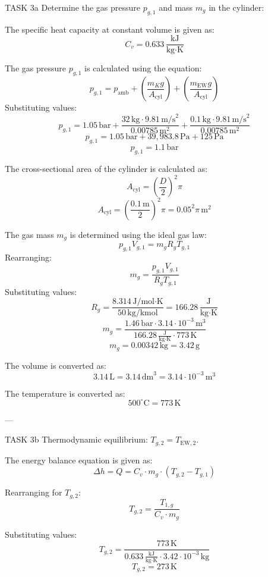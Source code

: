 TASK 3a  
Determine the gas pressure \( p_{g,1} \) and mass \( m_g \) in the cylinder:  

The specific heat capacity at constant volume is given as:  
\[
C_v = 0.633 \, \frac{\text{kJ}}{\text{kg·K}}
\]  

The gas pressure \( p_{g,1} \) is calculated using the equation:  
\[
p_{g,1} = p_{\text{amb}} + \left( \frac{m_K g}{A_{\text{cyl}}} \right) + \left( \frac{m_{\text{EW}} g}{A_{\text{cyl}}} \right)
\]  
Substituting values:  
\[
p_{g,1} = 1.05 \, \text{bar} + \frac{32 \, \text{kg} \cdot 9.81 \, \text{m/s}^2}{0.00785 \, \text{m}^2} + \frac{0.1 \, \text{kg} \cdot 9.81 \, \text{m/s}^2}{0.00785 \, \text{m}^2}
\]  
\[
p_{g,1} = 1.05 \, \text{bar} + 39,983.8 \, \text{Pa} + 125 \, \text{Pa}
\]  
\[
p_{g,1} = 1.1 \, \text{bar}
\]  

The cross-sectional area of the cylinder is calculated as:  
\[
A_{\text{cyl}} = \left( \frac{D}{2} \right)^2 \pi
\]  
\[
A_{\text{cyl}} = \left( \frac{0.1 \, \text{m}}{2} \right)^2 \pi = 0.05^2 \pi \, \text{m}^2
\]  

The gas mass \( m_g \) is determined using the ideal gas law:  
\[
p_{g,1} V_{g,1} = m_g R_g T_{g,1}
\]  
Rearranging:  
\[
m_g = \frac{p_{g,1} V_{g,1}}{R_g T_{g,1}}
\]  
Substituting values:  
\[
R_g = \frac{8.314 \, \text{J/mol·K}}{50 \, \text{kg/kmol}} = 166.28 \, \frac{\text{J}}{\text{kg·K}}
\]  
\[
m_g = \frac{1.46 \, \text{bar} \cdot 3.14 \cdot 10^{-3} \, \text{m}^3}{166.28 \, \frac{\text{J}}{\text{kg·K}} \cdot 773 \, \text{K}}
\]  
\[
m_g = 0.00342 \, \text{kg} = 3.42 \, \text{g}
\]  

The volume is converted as:  
\[
3.14 \, \text{L} = 3.14 \, \text{dm}^3 = 3.14 \cdot 10^{-3} \, \text{m}^3
\]  

The temperature is converted as:  
\[
500^\circ\text{C} = 773 \, \text{K}
\]  

---

TASK 3b  
Thermodynamic equilibrium: \( T_{g,2} = T_{\text{EW},2} \).  

The energy balance equation is given as:  
\[
\Delta h = Q = C_v \cdot m_g \cdot (T_{g,2} - T_{g,1})
\]  

Rearranging for \( T_{g,2} \):  
\[
T_{g,2} = \frac{T_{1,g}}{C_v \cdot m_g}
\]  

Substituting values:  
\[
T_{g,2} = \frac{773 \, \text{K}}{0.633 \, \frac{\text{kJ}}{\text{kg·K}} \cdot 3.42 \cdot 10^{-3} \, \text{kg}}
\]  
\[
T_{g,2} = 273 \, \text{K}
\]  

